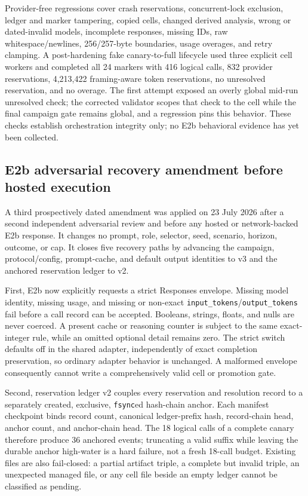 \documentclass[11pt]{article}
\newcommand{\code}[1]{\texttt{#1}}
\begin{document}
Provider-free regressions cover crash reservations, concurrent-lock
exclusion, ledger and marker tampering, copied cells, changed derived
analysis, wrong or dated-invalid models, incomplete responses, missing IDs,
raw whitespace/newlines, 256/257-byte boundaries, usage overages, and retry
clamping.  A post-hardening fake canary-to-full lifecycle used three explicit
cell workers and completed all 24 markers with 416 logical calls, 832 provider
reservations, 4,213,422 framing-aware token reservations, no unresolved
reservation, and no overage.  The first attempt exposed an overly global
mid-run unresolved check; the corrected validator scopes that check to the
cell while the final campaign gate remains global, and a regression pins this
behavior.  These checks establish orchestration integrity only; no E2b
behavioral evidence has yet been collected.

\subsection{E2b adversarial recovery amendment before hosted execution}

A third prospectively dated amendment was applied on 23 July 2026 after a
second independent adversarial review and before any hosted or network-backed
E2b response.  It changes no prompt, role, selector, seed, scenario, horizon,
outcome, or cap.  It closes five recovery paths by advancing the campaign,
protocol/config, prompt-cache, and default output identities to v3 and the
anchored reservation ledger to v2.

First, E2b now explicitly requests a strict Responses envelope.  Missing model
identity, missing usage, and missing or non-exact
\code{input\_tokens}/\code{output\_tokens} fail before a call record can be
accepted.  Booleans, strings, floats, and nulls are never coerced.  A present
cache or reasoning counter is subject to the same exact-integer rule, while an
omitted optional detail remains zero.  The strict switch defaults off in the
shared adapter, independently of exact completion preservation, so ordinary
adapter behavior is unchanged.  A malformed envelope consequently cannot
write a comprehensively valid cell or promotion gate.

Second, reservation ledger v2 couples every reservation and resolution record
to a separately created, exclusive, \code{fsync}ed hash-chain anchor.  Each
manifest checkpoint binds record count, canonical ledger-prefix hash,
record-chain head, anchor count, and anchor-chain head.  The 18 logical calls
of a complete canary therefore produce 36 anchored events; truncating a
valid suffix while leaving the durable anchor high-water is a hard failure,
not a fresh 18-call budget.  Existing files are also fail-closed: a partial
artifact triple, a complete but invalid triple, an unexpected managed file,
or any cell file beside an empty ledger cannot be classified as pending.
\end{document}

